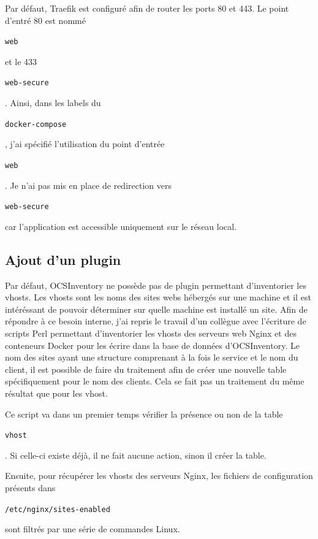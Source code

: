 \documentclass[12pt, a4paper, twoside]{article}
\begin{document}
Par défaut, \gls{Traefik} est configuré afin de router les ports 80 et 443.
Le point d'entré 80 est nommé \begin{code}\texttt{web}\end{code} et le 433 \begin{code}\texttt{web-secure}\end{code}.
Ainsi, dans les labels du \begin{code}\texttt{docker-compose}\end{code}, j'ai spécifié l'utilisation du point d'entrée \begin{code}\texttt{web}\end{code}.
Je n'ai pas mis en place de redirection vers \begin{code}\texttt{web-secure}\end{code} car l'application est accessible uniquement sur le réseau local.

\newpage
\subsection{Ajout d'un plugin}
Par défaut, \gls{OCSInventory} ne possède pas de plugin permettant d'inventorier les vhosts. 
Les vhosts sont les noms des sites webs hébergés sur une machine et il est intéréssant de pouvoir déterminer sur quelle machine est installé un site. 
Afin de répondre à ce besoin interne, j'ai repris le travail d'un collègue avec l'écriture de scripts Perl permettant d'inventorier les vhosts des serveurs web Nginx et des conteneurs Docker pour les écrire dans la base de données d'\gls{OCSInventory}.
Le nom des sites ayant une structure comprenant à la fois le service et le nom du client, il est possible de faire du traitement afin de créer une nouvelle table spécifiquement pour le nom des clients.
Cela se fait pas un traitement du même résultat que pour les vhost.

Ce script va dans un premier temps vérifier la présence ou non de la table \begin{code}\texttt{vhost}\end{code}.
Si celle-ci existe déjà, il ne fait aucune action, sinon il créer la table.

Ensuite, pour récupérer les vhosts des serveurs Nginx, les fichiers de configuration présents dans \begin{code}\texttt{/etc/nginx/sites-enabled}\end{code} sont filtrés par une série de commandes \gls{Linux}.
\end{document}
